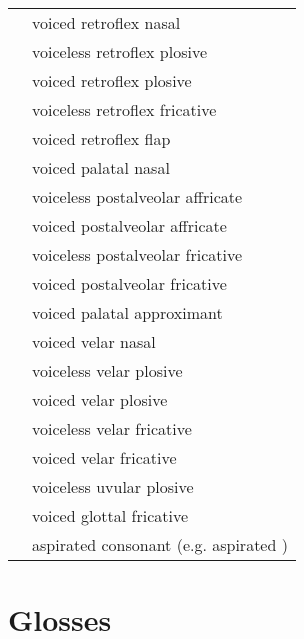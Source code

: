 \documentclass[12pt]{article}
\begin{document}
\begin{xltabular}{\textwidth}{lL}
   & voiced retroflex nasal \\
   & voiceless retroflex plosive \\
   & voiced retroflex plosive \\
   & voiceless retroflex fricative \\
   & voiced retroflex flap \\
  \ipa{\textltailn} & voiced palatal nasal \\
  \ipa{\t{\textteshlig}} & voiceless postalveolar affricate \\
  \ipa{\t{\textdyoghlig}} & voiced postalveolar affricate \\
   & voiceless postalveolar fricative \\
   & voiced postalveolar fricative \\
   & voiced palatal approximant \\
   & voiced velar nasal \\
   & voiceless velar plosive \\
   & voiced velar plosive \\
   & voiceless velar fricative \\
   & voiced velar fricative \\
   & voiceless uvular plosive \\
   & voiced glottal fricative \\
   & aspirated consonant (e.g. aspirated ) \\
\end{xltabular}

\newpage\section{Glosses}
\end{document}
